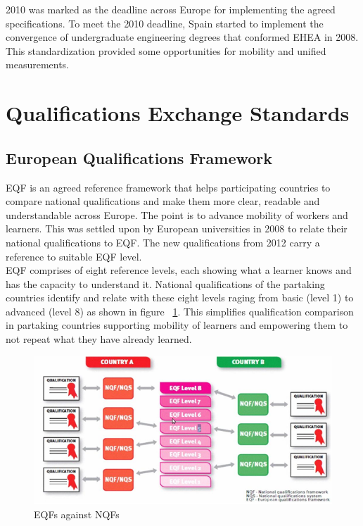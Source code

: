 \documentclass[12pt,a4paper,oneside]{book}
\begin{document}
	2010 was marked as the deadline across Europe for implementing the agreed specifications. \cite{EHEA} To meet the 2010 deadline, Spain started to implement the convergence of undergraduate engineering degrees that conformed EHEA in 2008. This standardization provided some opportunities for mobility and unified measurements. \cite{EHEA} \\

\section{Qualifications Exchange Standards}

    \subsection{European Qualifications Framework}
    EQF is an agreed reference framework that helps participating countries to compare national qualifications and make them more clear, readable and understandable across Europe. The point is to advance mobility of workers and learners. This was settled upon by European universities in 2008 to relate their national qualifications to EQF. The new qualifications from 2012 carry a reference to suitable EQF level. \\

    EQF comprises of eight reference levels, each showing what a learner knows and has the capacity to understand it. National qualifications of the partaking countries identify and relate with these eight levels raging from basic (level 1) to advanced (level 8) as shown in figure ~\ref{fig:EQF}. This simplifies qualification comparison in partaking countries supporting mobility of learners and empowering them to not repeat what they have already learned. \\

\begin{figure}[!hbp]
  \centering
  \includegraphics[width=14cm]{eqf.png}
  \caption{EQFs against NQFs \cite{MAPQFTOOL}}
  \label{fig:EQF}
\end{figure}
\end{document}
